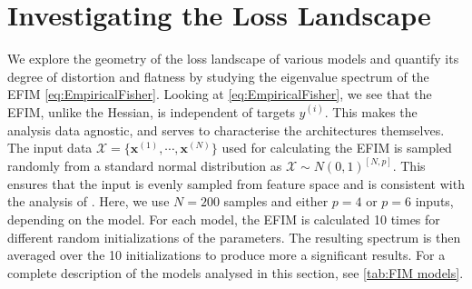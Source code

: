 \section{Investigating the Loss Landscape}\label{sec:Investigating the Loss Landscape}
We explore the geometry of the loss landscape of various models and quantify its degree of distortion and flatness by studying the eigenvalue spectrum of the EFIM \autoref{eq:EmpiricalFisher}. Looking at \autoref{eq:EmpiricalFisher}, we see that the EFIM, unlike the Hessian, is independent of targets $y^{(i)}$. This makes the analysis data agnostic, and serves to characterise the architectures themselves. The input data $\mathcal{X} = \{\boldsymbol{x}^{(1)}, \cdots, \boldsymbol{x}^{(N)}\}$ used for calculating the EFIM is sampled randomly from a standard normal distribution as $\mathcal{X} \sim N(0,1)^{[N,p]}$. This ensures that the input is evenly sampled from feature space and is consistent with the analysis of \citet{abbas2020power}. Here, we use $N=200$ samples and either $p=4$ or $p=6$ inputs, depending on the model. For each model, the EFIM is calculated 10 times for different random initializations of the parameters. The resulting spectrum is then averaged over the 10 initializations to produce more a significant results. For a complete description of the models analysed in this section, see \autoref{tab:FIM models}.


